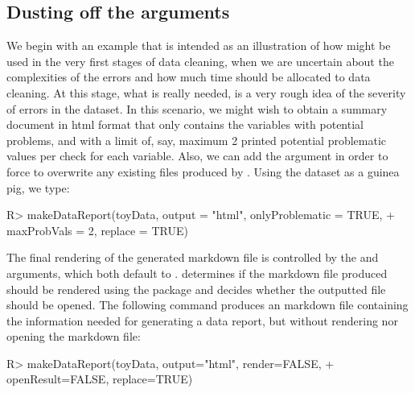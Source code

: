 \documentclass[article,shortnames]{jss}
\begin{document}

\subsection{Dusting off the arguments}
We begin with an example that is intended as an illustration of how
 might be used in the very first stages of data
cleaning, when we are uncertain about the complexities of the
errors and how much time should be allocated to data cleaning. At
this stage, what is really needed, is a very rough idea of the
severity of errors in the dataset. In this scenario, we might wish to
obtain a summary document in html format that only contains the
variables with potential problems, and with a limit of, say, maximum
2 printed potential problematic values per check for each variable. Also, we can add the
argument  in order to force  to
overwrite any existing files produced by .  Using the
 dataset as a guinea pig, we type:
  
\begin{Schunk}
\begin{Sinput}
R> makeDataReport(toyData, output = "html", onlyProblematic = TRUE,
+    maxProbVals = 2, replace = TRUE)
\end{Sinput}
\end{Schunk}

The final rendering of the generated markdown file is controlled by
the  and  arguments, which both default to
.  determines if the  markdown file
produced should be rendered using the  \citep{rmarkdown} package and
 decides whether the outputted file should be
opened. The following command produces an  markdown file
containing the information needed for generating a data report, but without
rendering nor opening the markdown file:

\begin{Schunk}
\begin{Sinput}
R> makeDataReport(toyData, output="html", render=FALSE,
+    openResult=FALSE, replace=TRUE)
\end{Sinput}
\end{Schunk}
\end{document}
